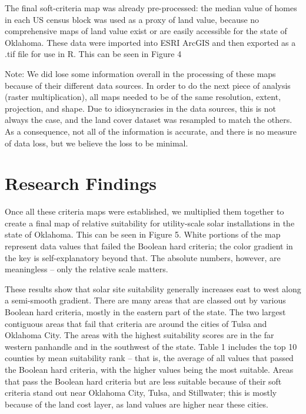 \documentclass[12pt,english]{article}
\begin{document}
The final soft-criteria map was already pre-processed: the median value of homes in each US census block was used as a proxy of land value, because no comprehensive maps of land value exist or are easily accessible for the state of Oklahoma. These data were imported into ESRI ArcGIS and then exported as a .tif file for use in R. This can be seen in Figure 4

Note: We did lose some information overall in the processing of these maps because of their different data sources. In order to do the next piece of analysis (raster multiplication), all maps needed to be of the same resolution, extent, projection, and shape. Due to idiosyncrasies in the data sources, this is not always the case, and the land cover dataset was resampled to match the others. As a consequence, not all of the information is accurate, and there is no measure of data loss, but we believe the loss to be minimal. 

\pagebreak{}



\section{Research Findings}\label{sec:results}

Once all these criteria maps were established, we multiplied them together to create a final map of relative suitability for utility-scale solar installations in the state of Oklahoma. This can be seen in Figure 5. White portions of the map represent data values that failed the Boolean hard criteria; the color gradient in the key is self-explanatory beyond that. The absolute numbers, however, are meaningless – only the relative scale matters.  

These results show that solar site suitability generally increases east to west along a semi-smooth gradient. There are many areas that are classed out by various Boolean hard criteria, mostly in the eastern part of the state. The two largest contiguous areas that fail that criteria are around the cities of Tulsa and Oklahoma City. The areas with the highest suitability scores are in the far western panhandle and in the southwest of the state. Table 1 includes the top 10 counties by mean suitability rank – that is, the average of all values that passed the Boolean hard criteria, with the higher values being the most suitable. Areas that pass the Boolean hard criteria but are less suitable because of their soft criteria stand out near Oklahoma City, Tulsa, and Stillwater; this is mostly because of the land cost layer, as land values are higher near these cities. 
\end{document}
